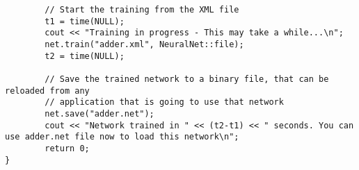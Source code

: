 \begin{DocInclude}
\begin{verbatim}
        // Start the training from the XML file
        t1 = time(NULL);
        cout << "Training in progress - This may take a while...\n";
        net.train("adder.xml", NeuralNet::file);
        t2 = time(NULL);

        // Save the trained network to a binary file, that can be reloaded from any
        // application that is going to use that network
        net.save("adder.net");
        cout << "Network trained in " << (t2-t1) << " seconds. You can use adder.net file now to load this network\n";
        return 0;
}

\end{verbatim}
\end{DocInclude}
 